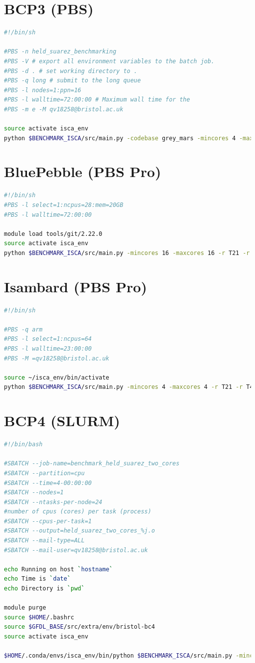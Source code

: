 \documentclass[a4paper,11pt]{report}
\newcommand{\toclesssection}[1]{\section{#1}\addtocounter{section}{1}}
\begin{document}
\toclesssection{BCP3 (PBS)}
\begin{lstlisting}[language=bash]
#!/bin/sh

#PBS -n held_suarez_benchmarking
#PBS -V # export all environment variables to the batch job.
#PBS -d . # set working directory to .
#PBS -q long # submit to the long queue
#PBS -l nodes=1:ppn=16 
#PBS -l walltime=72:00:00 # Maximum wall time for the
#PBS -m e -M qv18258@bristol.ac.uk 

source activate isca_env
python $BENCHMARK_ISCA/src/main.py -codebase grey_mars -mincores 4 -maxcores 4 -r T21 -r T42 -r T85
\end{lstlisting}

\toclesssection{BluePebble (PBS Pro)}
\begin{lstlisting}[language=bash]
#!/bin/sh
#PBS -l select=1:ncpus=28:mem=20GB
#PBS -l walltime=72:00:00

module load tools/git/2.22.0
source activate isca_env
python $BENCHMARK_ISCA/src/main.py -mincores 16 -maxcores 16 -r T21 -r T42 -codebase grey_mars -fc kind_4
\end{lstlisting}



\toclesssection{Isambard (PBS Pro)}
\begin{lstlisting}[language=bash]
#!/bin/sh

#PBS -q arm
#PBS -l select=1:ncpus=64
#PBS -l walltime=23:00:00
#PBS -M =qv18258@bristol.ac.uk

source ~/isca_env/bin/activate
python $BENCHMARK_ISCA/src/main.py -mincores 4 -maxcores 4 -r T21 -r T42 -r T85 -codebase held_suarez -fc cray_temp
\end{lstlisting}

\toclesssection{BCP4 (SLURM)}

\begin{lstlisting}[language=bash]
#!/bin/bash

#SBATCH --job-name=benchmark_held_suarez_two_cores
#SBATCH --partition=cpu
#SBATCH --time=4-00:00:00
#SBATCH --nodes=1
#SBATCH --ntasks-per-node=24
#number of cpus (cores) per task (process)
#SBATCH --cpus-per-task=1
#SBATCH --output=held_suarez_two_cores_%j.o
#SBATCH --mail-type=ALL
#SBATCH --mail-user=qv18258@bristol.ac.uk

echo Running on host `hostname`
echo Time is `date`
echo Directory is `pwd`

module purge
source $HOME/.bashrc
source $GFDL_BASE/src/extra/env/bristol-bc4
source activate isca_env

$HOME/.conda/envs/isca_env/bin/python $BENCHMARK_ISCA/src/main.py -mincores 2 -maxcores 2 -r T21 -r T42 -codebase held_suarez -fc gcc
\end{lstlisting}
\end{document}
